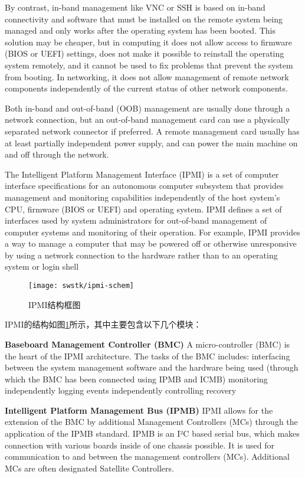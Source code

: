 By contrast, in-band management like VNC or SSH is based on in-band connectivity and software that must be installed on the remote system being managed and only works after the operating system has been booted. This solution may be cheaper, but in computing it does not allow access to firmware (BIOS or UEFI) settings, does not make it possible to reinstall the operating system remotely, and it cannot be used to fix problems that prevent the system from booting. In networking, it does not allow management of remote network components independently of the current status of other network components.

Both in-band and out-of-band (OOB) management are usually done through a network connection, but an out-of-band management card can use a physically separated network connector if preferred. A remote management card usually has at least partially independent power supply, and can power the main machine on and off through the network.

The Intelligent Platform Management Interface (IPMI) is a set of computer interface specifications for an autonomous computer subsystem that provides management and monitoring capabilities independently of the host system's CPU, firmware (BIOS or UEFI) and operating system. IPMI defines a set of interfaces used by system administrators for out-of-band management of computer systems and monitoring of their operation. For example, IPMI provides a way to manage a computer that may be powered off or otherwise unresponsive by using a network connection to the hardware rather than to an operating system or login shell

\begin{figure}[tbh]
  \centering
  \texttt{[image: swstk/ipmi-schem]}
  \caption{IPMI结构框图}
  \label{fig:ipmi-schem}
\end{figure}

IPMI的结构如图\ref{fig:ipmi-schem}所示，其中主要包含以下几个模块：

\textbf{Baseboard Management Controller (BMC)}\quad
A micro-controller (BMC) is the heart of the IPMI architecture. The tasks of the BMC includes:
interfacing between the system management software and the hardware being used (through which the BMC has been connected using IPMB and ICMB)
monitoring independently
logging events independently
controlling recovery

\textbf{Intelligent Platform Management Bus (IPMB)}\quad
IPMI allows for the extension of the BMC by additional Management Controllers (MCs) through the application of the IPMB standard.
IPMB is an I²C based serial bus, which makes connection with various boards inside of one chassis possible. It is used for communication to and between the management controllers (MCs). Additional MCs are often designated Satellite Controllers.

